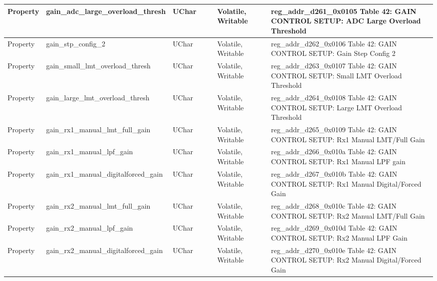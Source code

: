 \documentclass{article}
\begin{document}
\begin{scriptsize}
\begin{longtable}{|p{2cm}|p{5cm}|p{1cm}|p{2cm}|p{2cm}|p{1.75cm}|p{1.5cm}|p{5.1cm}|}
  \hline
  Property & gain\_adc\_large\_overload\_thresh                       & UChar &                  &                  & Volatile,  Writable &         & reg\_addr\_d261\_0x0105 Table 42: GAIN CONTROL SETUP: ADC Large Overload Threshold \\
  \hline
  Property & gain\_stp\_config\_2                                     & UChar &                  &                  & Volatile,  Writable &         & reg\_addr\_d262\_0x0106 Table 42: GAIN CONTROL SETUP: Gain Step Config 2 \\
  \hline
  Property & gain\_small\_lmt\_overload\_thresh                       & UChar &                  &                  & Volatile,  Writable &         & reg\_addr\_d263\_0x0107 Table 42: GAIN CONTROL SETUP: Small LMT Overload Threshold \\
  \hline
  Property & gain\_large\_lmt\_overload\_thresh                       & UChar &                  &                  & Volatile,  Writable &         & reg\_addr\_d264\_0x0108 Table 42: GAIN CONTROL SETUP: Large LMT Overload Threshold \\
  \hline
  Property & gain\_rx1\_manual\_lmt\_full\_gain                       & UChar &                  &                  & Volatile,  Writable &         & reg\_addr\_d265\_0x0109 Table 42: GAIN CONTROL SETUP: Rx1 Manual LMT/Full Gain \\
  \hline
  Property & gain\_rx1\_manual\_lpf\_gain                             & UChar &                  &                  & Volatile,  Writable &         & reg\_addr\_d266\_0x010a Table 42: GAIN CONTROL SETUP: Rx1 Manual LPF gain \\
  \hline
  Property & gain\_rx1\_manual\_digitalforced\_gain                   & UChar &                  &                  & Volatile,  Writable &         & reg\_addr\_d267\_0x010b Table 42: GAIN CONTROL SETUP: Rx1 Manual Digital/Forced Gain \\
  \hline
  Property & gain\_rx2\_manual\_lmt\_full\_gain                       & UChar &                  &                  & Volatile,  Writable &         & reg\_addr\_d268\_0x010c Table 42: GAIN CONTROL SETUP: Rx2 Manual LMT/Full Gain \\
  \hline
  Property & gain\_rx2\_manual\_lpf\_gain                             & UChar &                  &                  & Volatile,  Writable &         & reg\_addr\_d269\_0x010d Table 42: GAIN CONTROL SETUP: Rx2 Manual LPF Gain \\
  \hline
  Property & gain\_rx2\_manual\_digitalforced\_gain                   & UChar &                  &                  & Volatile,  Writable &         & reg\_addr\_d270\_0x010e Table 42: GAIN CONTROL SETUP: Rx2 Manual Digital/Forced Gain \\

\end{longtable}
\end{scriptsize}
\end{document}
